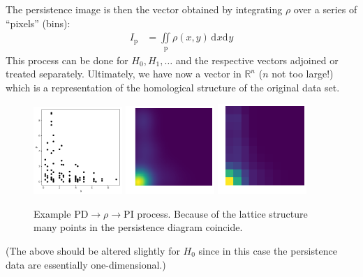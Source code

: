 \documentclass[11pt]{article}
\renewcommand{\d}[2][]{\mathrm{d}^{#1}{#2}}
\begin{document}
The persistence image is then the vector obtained by integrating $\rho$ over a series of ``pixels'' (bins):
\begin{align}
    I_\text{p} &= \iint\limits_\text{p}\rho(x,y)\,\d{x}\d{y}
\end{align}
This process can be done for $H_0,H_1,\ldots$ and the respective vectors adjoined or treated separately. Ultimately, we have now a vector in $\mathbb{R}^n$ ($n$ not too large!) which is a representation of the homological structure of the original data set.

\begin{figure}[h]
    \centering
    \includegraphics[width=0.3\textwidth]{pd_example}
    \includegraphics[width=0.3\textwidth]{rho_example}
    \includegraphics[width=0.3\textwidth]{pi_example}
    \caption{Example PD$\rightarrow\rho\rightarrow$PI process. Because of the lattice structure many points in the persistence diagram coincide.}
\end{figure}

(The above should be altered slightly for $H_0$ since in this case the persistence data are essentially one-dimensional.)


\newpage
\end{document}
